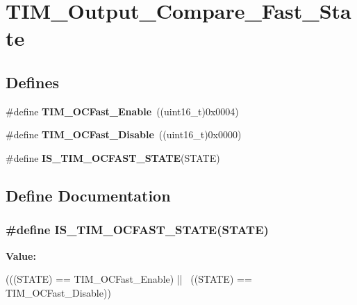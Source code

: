 \hypertarget{group__TIM__Output__Compare__Fast__State}{
\section{TIM\_\-Output\_\-Compare\_\-Fast\_\-State}
\label{group__TIM__Output__Compare__Fast__State}
}
\subsection*{Defines}
\begin{DoxyCompactItemize}
\item 
\hypertarget{group__TIM__Output__Compare__Fast__State_ga0cfb598c985363ee7004e52c97c524a3}{
\#define {\bfseries TIM\_\-OCFast\_\-Enable}~((uint16\_\-t)0x0004)}
\label{group__TIM__Output__Compare__Fast__State_ga0cfb598c985363ee7004e52c97c524a3}

\item 
\hypertarget{group__TIM__Output__Compare__Fast__State_gab3d39f8797953cb58754205169d8278e}{
\#define {\bfseries TIM\_\-OCFast\_\-Disable}~((uint16\_\-t)0x0000)}
\label{group__TIM__Output__Compare__Fast__State_gab3d39f8797953cb58754205169d8278e}

\item 
\#define {\bfseries IS\_\-TIM\_\-OCFAST\_\-STATE}(STATE)
\end{DoxyCompactItemize}


\subsection{Define Documentation}
\hypertarget{group__TIM__Output__Compare__Fast__State_ga65ad85cb4ba48660e8f519a1f6c298d2}{
\subsubsection[{IS\_\-TIM\_\-OCFAST\_\-STATE}]{\setlength{\rightskip}{0pt plus 5cm}\#define IS\_\-TIM\_\-OCFAST\_\-STATE(STATE)}}
\label{group__TIM__Output__Compare__Fast__State_ga65ad85cb4ba48660e8f519a1f6c298d2}
{\bfseries Value:}
\begin{DoxyCode}
(((STATE) == TIM_OCFast_Enable) || \
                                    ((STATE) == TIM_OCFast_Disable))
\end{DoxyCode}
